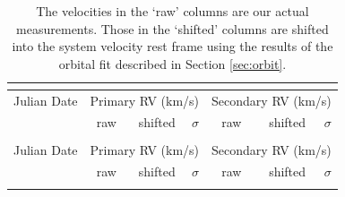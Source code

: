 \begin{small}
\begin{longtable}{lrrrrrr}
    
    \caption{The velocities in the `raw' columns are our actual measurements. Those in the `shifted' columns are shifted into the system velocity rest frame using the results of the orbital fit described in Section \ref{sec:orbit}.} \\
  \label{tab:rv_data}

    \\ \hline
    Julian Date & \multicolumn{3}{c}{Primary RV (km/s)} & \multicolumn{3}{c}{Secondary RV (km/s)} \\
& raw & shifted & $\sigma$  & raw & shifted  & $\sigma$ \\ \hline
    \endfirsthead

    \\ \hline
    Julian Date & \multicolumn{3}{c}{Primary RV (km/s)} & \multicolumn{3}{c}{Secondary RV (km/s)} \\
& raw & shifted & $\sigma$  & raw & shifted  & $\sigma$ \\ \hline
    \endhead

    \hline
    \endfoot

    \hline
    \endlastfoot



\end{longtable}
\end{small}
